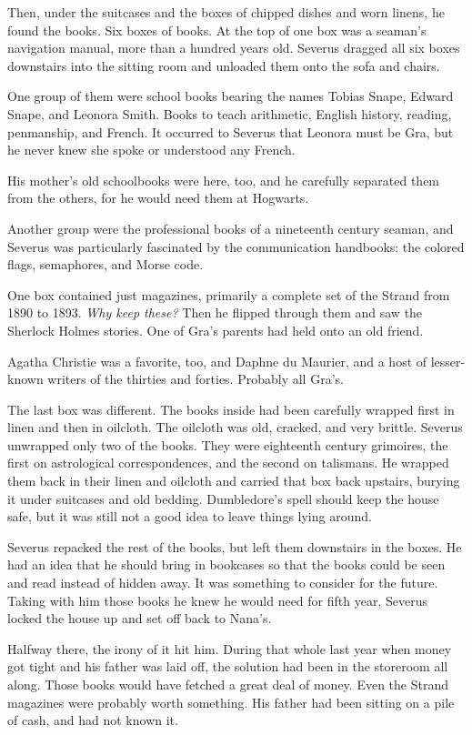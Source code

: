 \documentclass[a4paper,11pt]{article}
\begin{document}
Then, under the suitcases and the boxes of chipped dishes and worn linens, he found the books. Six boxes of books. At the top of one box was a seaman's navigation manual, more than a hundred years old. Severus dragged all six boxes downstairs into the sitting room and unloaded them onto the sofa and chairs.

One group of them were school books bearing the names Tobias Snape, Edward Snape, and Leonora Smith. Books to teach arithmetic, English history, reading, penmanship, and French. It occurred to Severus that Leonora must be Gra, but he never knew she spoke or understood any French.

His mother's old schoolbooks were here, too, and he carefully separated them from the others, for he would need them at Hogwarts.

Another group were the professional books of a nineteenth century seaman, and Severus was particularly fascinated by the communication handbooks: the colored flags, semaphores, and Morse code.

One box contained just magazines, primarily a complete set of the Strand from 1890 to 1893. \emph{Why keep these?} Then he flipped through them and saw the Sherlock Holmes stories. One of Gra's parents had held onto an old friend.

Agatha Christie was a favorite, too, and Daphne du Maurier, and a host of lesser-known writers of the thirties and forties. Probably all Gra's.

The last box was different. The books inside had been carefully wrapped first in linen and then in oilcloth. The oilcloth was old, cracked, and very brittle. Severus unwrapped only two of the books. They were eighteenth century grimoires, the first on astrological correspondences, and the second on talismans. He wrapped them back in their linen and oilcloth and carried that box back upstairs, burying it under suitcases and old bedding. Dumbledore's spell should keep the house safe, but it was still not a good idea to leave things lying around.

Severus repacked the rest of the books, but left them downstairs in the boxes. He had an idea that he should bring in bookcases so that the books could be seen and read instead of hidden away. It was something to consider for the future. Taking with him those books he knew he would need for fifth year, Severus locked the house up and set off back to Nana's.

Halfway there, the irony of it hit him. During that whole last year when money got tight and his father was laid off, the solution had been in the storeroom all along. Those books would have fetched a great deal of money. Even the Strand magazines were probably worth something. His father had been sitting on a pile of cash, and had not known it.
\end{document}
